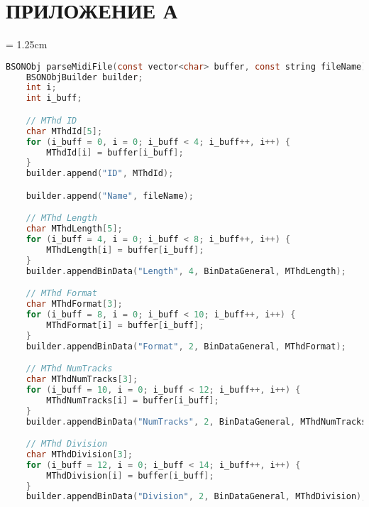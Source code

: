 \chapter{ПРИЛОЖЕНИЕ А}
\parindent = 1.25cm
%
%

\begin{lstlisting}[language=C, label=some-code, caption=Метод создания  документа MongoDB по спецификации MIDI (часть 1), label=lst:parser_midi1]
BSONObj parseMidiFile(const vector<char> buffer, const string fileName) {
    BSONObjBuilder builder;
    int i;
    int i_buff;

    // MThd ID
    char MThdId[5];
    for (i_buff = 0, i = 0; i_buff < 4; i_buff++, i++) {
        MThdId[i] = buffer[i_buff];
    }
    builder.append("ID", MThdId);

    builder.append("Name", fileName);

    // MThd Length
    char MThdLength[5];
    for (i_buff = 4, i = 0; i_buff < 8; i_buff++, i++) {
        MThdLength[i] = buffer[i_buff];
    }
    builder.appendBinData("Length", 4, BinDataGeneral, MThdLength);

    // MThd Format
    char MThdFormat[3];
    for (i_buff = 8, i = 0; i_buff < 10; i_buff++, i++) {
        MThdFormat[i] = buffer[i_buff];
    }
    builder.appendBinData("Format", 2, BinDataGeneral, MThdFormat);

    // MThd NumTracks
    char MThdNumTracks[3];
    for (i_buff = 10, i = 0; i_buff < 12; i_buff++, i++) {
        MThdNumTracks[i] = buffer[i_buff];
    }
    builder.appendBinData("NumTracks", 2, BinDataGeneral, MThdNumTracks);

    // MThd Division
    char MThdDivision[3];
    for (i_buff = 12, i = 0; i_buff < 14; i_buff++, i++) {
        MThdDivision[i] = buffer[i_buff];
    }
    builder.appendBinData("Division", 2, BinDataGeneral, MThdDivision);
\end{lstlisting}

